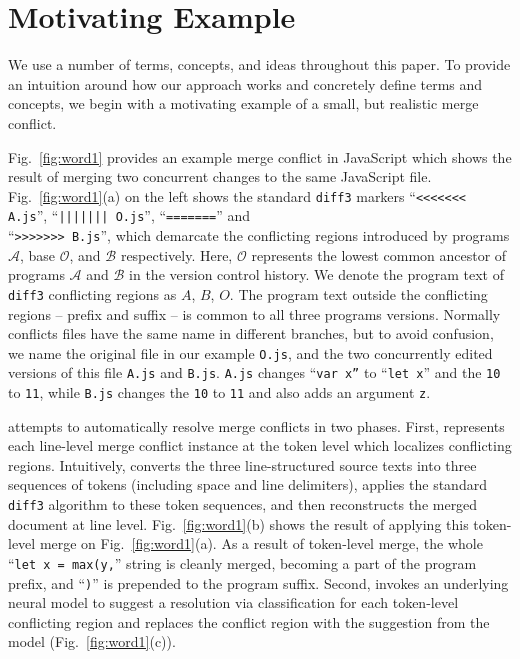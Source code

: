 \section{Motivating Example}

We use a number of terms, concepts, and ideas throughout this paper.  To provide an intuition around how our approach works and concretely define terms and concepts, we begin with a motivating example of a small, but realistic merge conflict.



Fig.~\ref{fig:word1} provides an example merge conflict in JavaScript which shows the result of merging two concurrent changes to the same JavaScript file. Fig.~\ref{fig:word1}(a) on the left shows the standard \texttt{diff3} markers ``\texttt{<{}<{}<{}<{}<{}<{}< A.js}'', ``\texttt{||||||| O.js}'', ``\texttt{=======}'' and \\ ``\texttt{>{}>{}>{}>{}>{}>{}> B.js}'', which demarcate the conflicting regions introduced by programs $\mathcal{A}$, base $\mathcal{O}$, and $\mathcal{B}$ respectively. Here, $\mathcal{O}$ represents the lowest common ancestor of programs $\mathcal{A}$ and $\mathcal{B}$ in the version control history. We denote the program text of \texttt{diff3} conflicting regions as $A$, $B$, $O$. The program text outside the conflicting regions – prefix and suffix -- is common to all three programs versions.
Normally conflicts files have the same name in different branches, but to avoid confusion, we name the original file in our example \texttt{O.js}, and the two concurrently edited versions of this file \texttt{A.js} and \texttt{B.js}.
\texttt{A.js} changes ``\texttt{var x''} to ``\texttt{let x}'' and the \texttt{10} to \texttt{11}, while \texttt{B.js} changes the \texttt{10} to \texttt{11} and also adds an argument \texttt{z}.

\thistool{} attempts to automatically resolve merge conflicts in two phases.  
First, \thistool{} represents each line-level merge conflict instance at the token level which localizes conflicting regions.  
Intuitively, \thistool{} converts the three line-structured source texts into three sequences of tokens (including space and line delimiters), applies the standard \texttt{diff3} algorithm to these token sequences, and then reconstructs the merged document at line level. 
Fig.~\ref{fig:word1}(b) shows the result of applying this token-level merge on Fig.~\ref{fig:word1}(a). 
As a result of token-level merge, the whole ``\texttt{let x = max(y,}'' string is cleanly merged, becoming a part of the program prefix, and ``\texttt{)}'' is prepended to the program suffix.  
Second, \thistool{} invokes an underlying neural model to suggest a resolution via classification for each token-level conflicting region and replaces the conflict region with the suggestion from the model (Fig.~\ref{fig:word1}(c)). 

